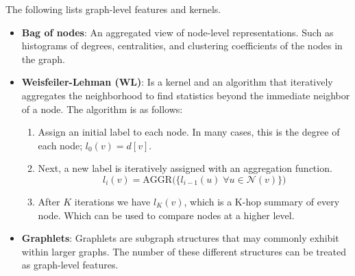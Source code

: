 \documentclass[twocolumn]{article}
\theoremstyle{plain}
\begin{document}
The following lists graph-level features and kernels.
\begin{itemize}
    \item \textbf{Bag of nodes}: An aggregated view of node-level representations. Such as histograms of degrees, centralities, and clustering coefficients of the nodes in the graph.
    \item \textbf{Weisfeiler-Lehman (WL)}: Is a kernel and an algorithm that iteratively aggregates the neighborhood to find statistics beyond the immediate neighbor of a node. The algorithm is as follows:
        \begin{enumerate}
            \item Assign an initial label to each node. In many cases, this is the degree of each node; $l_0(v) = d[v]$.
            \item Next, a new label is iteratively assigned with an aggregation function.
                \begin{equation}
                    l_i(v) = \text{AGGR}\bigl( \{ l_{i-1}(u) \; \forall u \in \mathcal{N}(v) \}\bigr)
                \end{equation}
            \item After $K$ iterations we have $l_K(v)$, which is a K-hop summary of every node. Which can be used to compare nodes at a higher level.
        \end{enumerate}
    \item \textbf{Graphlets}: Graphlets are subgraph structures that may commonly exhibit within larger graphs. The number of these different structures can be treated as graph-level features.
\end{itemize}
\end{document}
